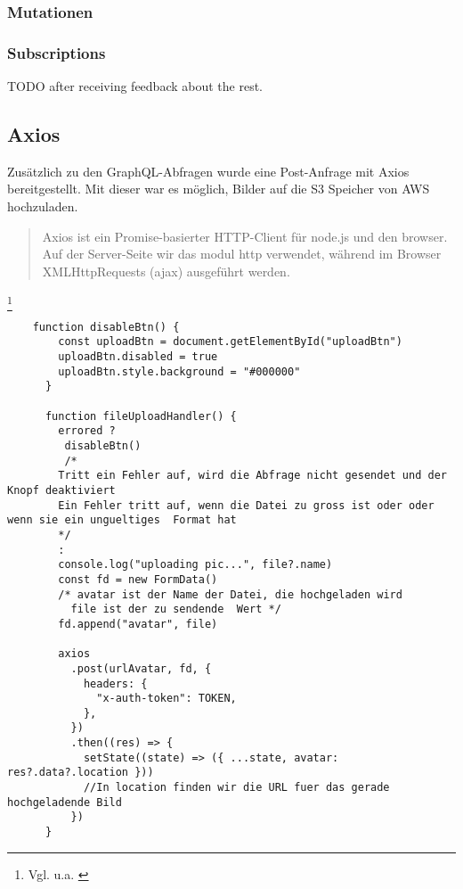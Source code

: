 \subsubsection{Mutationen}
\subsubsection{Subscriptions}

TODO after receiving feedback about the rest.

\newpage
\subsection{Axios}
Zusätzlich zu den GraphQL-Abfragen wurde eine Post-Anfrage mit Axios bereitgestellt.
Mit dieser war es möglich, Bilder auf die S3 Speicher von AWS hochzuladen.

\begin{quote}
  Axios ist ein Promise-basierter HTTP-Client für node.js und den browser. Auf der Server-Seite wir das modul http verwendet, während im Browser XMLHttpRequests (ajax) ausgeführt werden.
\end{quote}\footnote{Vgl. u.a. \cite{AX1}}

\begin{lstlisting}
    function disableBtn() {
        const uploadBtn = document.getElementById("uploadBtn")
        uploadBtn.disabled = true
        uploadBtn.style.background = "#000000"
      }
    
      function fileUploadHandler() {
        errored ? 
         disableBtn()
         /*
        Tritt ein Fehler auf, wird die Abfrage nicht gesendet und der Knopf deaktiviert 
        Ein Fehler tritt auf, wenn die Datei zu gross ist oder oder wenn sie ein ungueltiges  Format hat
        */
        :
        console.log("uploading pic...", file?.name)
        const fd = new FormData()
        /* avatar ist der Name der Datei, die hochgeladen wird
          file ist der zu sendende  Wert */
        fd.append("avatar", file)  
    
        axios
          .post(urlAvatar, fd, {
            headers: {
              "x-auth-token": TOKEN,
            },
          })
          .then((res) => {
            setState((state) => ({ ...state, avatar: res?.data?.location }))    
            //In location finden wir die URL fuer das gerade hochgeladende Bild 
          })
      }\end{lstlisting}



